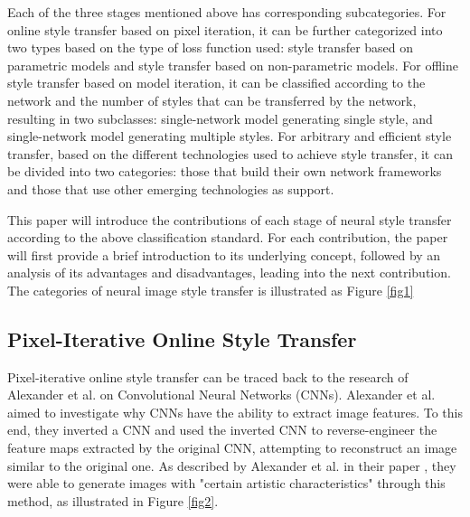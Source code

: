 Each of the three stages mentioned above has corresponding subcategories. For online style transfer based on pixel iteration, it can be further categorized into two types based on the type of loss function used: style transfer based on parametric models and style transfer based on non-parametric models. For offline style transfer based on model iteration, it can be classified according to the network and the number of styles that can be transferred by the network, resulting in two subclasses: single-network model generating single style, and single-network model generating multiple styles. For arbitrary and efficient style transfer, based on the different technologies used to achieve style transfer, it can be divided into two categories: those that build their own network frameworks and those that use other emerging technologies as support.

This paper will introduce the contributions of each stage of neural style transfer according to the above classification standard. For each contribution, the paper will first provide a brief introduction to its underlying concept, followed by an analysis of its advantages and disadvantages, leading into the next contribution. The categories of neural image style transfer is illustrated as Figure \ref{fig1}

\subsection{Pixel-Iterative Online Style Transfer}

Pixel-iterative online style transfer can be traced back to the research of Alexander et al. \citep{24mordvintsev2015inceptionism} on Convolutional Neural Networks (CNNs). Alexander et al. \citep{24mordvintsev2015inceptionism} aimed to investigate why CNNs have the ability to extract image features. To this end, they inverted a CNN and used the inverted CNN to reverse-engineer the feature maps extracted by the original CNN, attempting to reconstruct an image similar to the original one. As described by Alexander et al. in their paper \citep{24mordvintsev2015inceptionism}, they were able to generate images with "certain artistic characteristics" through this method, as illustrated in Figure \ref{fig2}.


